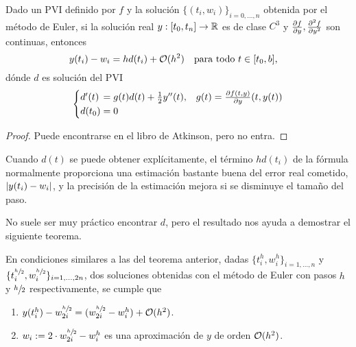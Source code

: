 \begin{theorem}
    Dado un PVI definido por $f$
    y la solución $\{(t_i, w_i)\}_{i = 0,\ldots, n}$
    obtenida por el método de Euler,
    si la solución real $y : [t_0, t_n] \to \mathbb{R}$ es de clase $C^3$
    y $\pdv{f}{y},\pdv[2]{f}{y}$ son continuas,
    entonces
    \begin{equation}
        y(t_i) - w_i = hd(t_i) + \vo(h^2) \qq{para todo $t \in [t_0,b]$,}
    \end{equation}
    dónde $d$ es solución del PVI
    \begin{equation}
    \begin{cases}
        d'(t) \, = g(t)d(t) + \frac{1}{2}y''(t),
            & g(t) = \pdv{f(t,y)}{y}\qty(t, y(t)) \\
        d(t_0) = 0
    \end{cases}
    \end{equation}
\end{theorem}

\begin{proof}
    Puede encontrarse en el libro de Atkinson, pero no entra.
\end{proof}

\begin{remark}
    Cuando $d(t)$ se puede obtener explícitamente,
    el término $hd(t_i)$ de la fórmula normalmente proporciona
    una estimación bastante buena del error real cometido, $\abs{y(t_i) - w_i}$,
    y la precisión de la estimación mejora si se disminuye el tamaño del paso.
\end{remark}

No suele ser muy práctico encontrar $d$,
pero el resultado nos ayuda a demostrar el siguiente teorema.

\begin{theorem}
    \newcommand{\hh}{\sfrac{h}{2}}

    En condiciones similares a las del teorema anterior,
    dadas $\{t_i^h, w_i^h\}_{i = 1,\ldots,n}$
    y $\{t_i^{\hh}, w_i^{\hh}\}_{i = 1,\ldots,2n}$,
    dos soluciones obtenidas con el método de Euler
    con pasos $h$ y $\hh$ respectivamente,
    se cumple que
    \begin{enumerate}[label=(\alph*)]
        \item $y(t_i^h) - w_{2i}^{\hh} = (w_{2i}^{\hh} - w_i^h) + \vo(h^2)$.
        \item $w_i := 2\cdot w_{2i}^{\hh} - w_i^h$
        es una aproximación de $y$ de orden $\vb{\mathcal{O}}{}(h^2)$.
    \end{enumerate}
\end{theorem}

